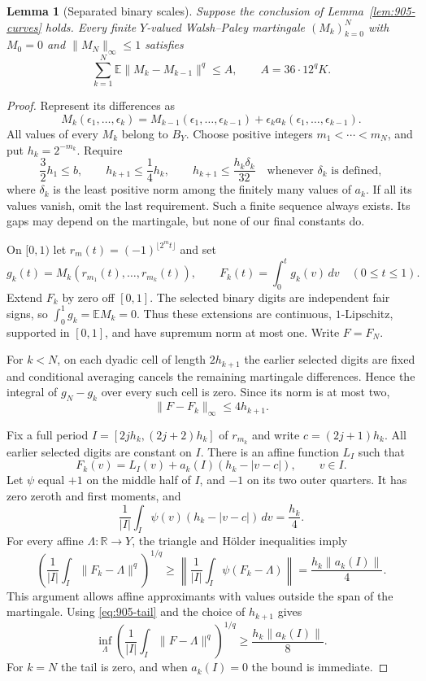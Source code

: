 \documentclass[11pt,a4paper]{article}
\newtheorem{lemma}[theorem]{Lemma}
\theoremstyle{remark}
\begin{document}
\begin{lemma}[Separated binary scales]\label{lem:905-energy}
Suppose the conclusion of Lemma~\ref{lem:905-curves} holds.  Every finite
$Y$-valued Walsh--Paley martingale $(M_k)_{k=0}^N$ with $M_0=0$ and
$\|M_N\|_\infty\leq1$ satisfies
\begin{equation}\label{eq:905-energy}
 \sum_{k=1}^N\mathbb E\|M_k-M_{k-1}\|^q\leq A,
 \qquad A=36\cdot12^qK.
\end{equation}
\end{lemma}
\begin{proof}
Represent its differences as
\[
 M_k(\epsilon_1,\ldots,\epsilon_k)
 =M_{k-1}(\epsilon_1,\ldots,\epsilon_{k-1})
 +\epsilon_k a_k(\epsilon_1,\ldots,\epsilon_{k-1}).
\]
All values of every $M_k$ belong to $B_Y$.  Choose positive integers
$m_1<\cdots<m_N$, and put $h_k=2^{-m_k}$.  Require
\[
 \frac32h_1\leq b,\qquad h_{k+1}\leq\frac14h_k,
 \qquad
 h_{k+1}\leq\frac{h_k\delta_k}{32}
 \quad\text{whenever }\delta_k\text{ is defined},
\]
where $\delta_k$ is the least positive norm among the finitely many
values of $a_k$.  If all its values vanish, omit the last requirement.
Such a finite sequence always exists.  Its gaps may depend on the
martingale, but none of our final constants do.

On $[0,1)$ let $r_m(t)=(-1)^{\lfloor2^mt\rfloor}$ and set
\[
 g_k(t)=M_k(r_{m_1}(t),\ldots,r_{m_k}(t)),\qquad
 F_k(t)=\int_0^t g_k(v)\,dv\quad(0\leq t\leq1).
\]
Extend $F_k$ by zero off $[0,1]$.  The selected binary digits are
independent fair signs, so $\int_0^1g_k=\mathbb EM_k=0$.
Thus these extensions are continuous, $1$-Lipschitz, supported in
$[0,1]$, and have supremum norm at most one.  Write $F=F_N$.

For $k<N$, on each dyadic cell of length $2h_{k+1}$ the earlier selected
digits are fixed and conditional averaging cancels the remaining
martingale differences.  Hence the integral of $g_N-g_k$ over every
such cell is zero.  Since its norm is at most two,
\begin{equation}\label{eq:905-tail}
 \|F-F_k\|_\infty\leq4h_{k+1}.
\end{equation}

Fix a full period $I=[2jh_k,(2j+2)h_k]$ of $r_{m_k}$ and write
$c=(2j+1)h_k$.  All earlier selected digits are constant on $I$.
There is an affine function $L_I$ such that
\[
 F_k(v)=L_I(v)+a_k(I)(h_k-|v-c|),\qquad v\in I.
\]
Let $\psi$ equal $+1$ on the middle half of $I$, and $-1$ on its two
outer quarters.  It has zero zeroth and first moments, and
\[
 \frac1{|I|}\int_I\psi(v)(h_k-|v-c|)\,dv=\frac{h_k}{4}.
\]
For every affine $\Lambda:\mathbb R\to Y$, the triangle and H\"older
inequalities imply
\[
 \left(\frac1{|I|}\int_I\|F_k-\Lambda\|^q\right)^{1/q}
 \geq\left\|\frac1{|I|}\int_I\psi(F_k-\Lambda)\right\|
 =\frac{h_k\|a_k(I)\|}{4}.
\]
This argument allows affine approximants with values outside the span
of the martingale.  Using \eqref{eq:905-tail} and the choice of
$h_{k+1}$ gives
\begin{equation}\label{eq:905-tent}
 \inf_\Lambda\left(\frac1{|I|}\int_I\|F-\Lambda\|^q\right)^{1/q}
 \geq\frac{h_k\|a_k(I)\|}{8}.
\end{equation}
For $k=N$ the tail is zero, and when $a_k(I)=0$ the bound is immediate.


\end{proof}
\end{document}
